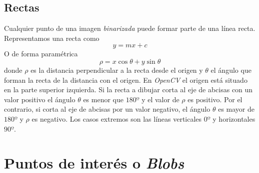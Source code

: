\subsection{Rectas}
Cualquier punto de una imagen \emph{binarizada} puede formar parte de
una línea recta. Representamos una recta como
\begin{equation*}
  y = mx +c
\end{equation*}
O de forma paramétrica
\begin{equation*}
  \rho = x \cos \theta + y \sin \theta
\end{equation*}
donde $\rho$ es la distancia perpendicular a la recta desde el origen y
$\theta$ el ángulo que forman la recta de la distancia con el
origen. En \emph{OpenCV} el origen está situado en la parte superior
izquierda. Si la recta a dibujar corta al eje de abcisas con un valor
positivo el ángulo $\theta$ es menor que $180º$ y el valor de $\rho$
es positivo. Por el contrario, si corta al eje de abcisas por un valor
negativo, el ángulo $\theta$ es mayor de $180º$ y $\rho$ es
negativo. Los casos extremos son las líneas verticales $0º$ y
horizontales $90º$.
\section{Puntos de interés o \emph{Blobs}}